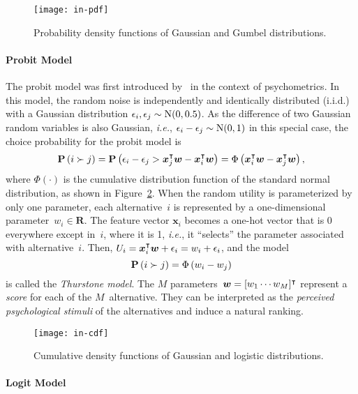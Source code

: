 \begin{figure}
	\centering
	\texttt{[image: in-pdf]}
	\caption{Probability density functions of Gaussian and Gumbel distributions.}
	\label{in:fig:pdf}
\end{figure}

\paragraph{Probit Model}

The probit model was first introduced by~\citet{thurstone1927law} in the context of psychometrics.
In this model, the random noise is independently and identically distributed (i.i.d.) with a Gaussian distribution $\epsilon_i, \epsilon_j \sim \mathrm{N}( 0, 0.5 )$.
As the difference of two Gaussian random variables is also Gaussian, \textit{i.e.}, $\epsilon_i - \epsilon_j \sim \mathrm{N}( 0, 1 )$ in this special case, the choice probability for the probit model is
\begin{equation}
	\label{in:eq:probit}
	\mathbf{P}\left( i \succ j \right) = \mathbf{P}\left( \epsilon_i - \epsilon_j > \bm{x}_j^\intercal \bm{w} - \bm{x}_i^\intercal \bm{w} \right) = \Phi \left( \bm{x}_i^\intercal \bm{w} - \bm{x}_j^\intercal \bm{w} \right),
\end{equation}
where $\Phi( \cdot )$ is the cumulative distribution function of the standard normal distribution, as shown in Figure~\ref{in:fig:cdf}.
When the random utility is parameterized by only one parameter, each alternative~$i$ is represented by a one-dimensional parameter~$w_i \in \mathbf{R}$.
The feature vector $\bm{x}_i$ becomes a one-hot vector that is 0 everywhere except in~$i$, where it is 1, \textit{i.e.}, it ``selects'' the parameter associated with alternative~$i$.
Then, $U_i = \bm{x}_i^\intercal \bm{w} + \epsilon_i = w_i + \epsilon_i$, and the model
\begin{equation*}
	\mathbf{P}\left( i \succ j \right) = \Phi \left( w_i - w_j \right)
\end{equation*}
is called the \emph{Thurstone model}.
The $M$ parameters~$\bm{w} = [w_1 \cdots w_M]^\intercal$ represent a \emph{score} for each of the $M$~alternative.
They can be interpreted as the \emph{perceived psychological stimuli} of the alternatives and induce a natural ranking.

\begin{figure}
	\centering
	\texttt{[image: in-cdf]}
	\caption{Cumulative density functions of Gaussian and logistic distributions.}
	\label{in:fig:cdf}
\end{figure}

\paragraph{Logit Model}

